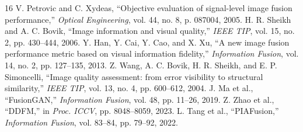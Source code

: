 \documentclass[conference]{IEEEtran}
\begin{document}
\begin{thebibliography}{16}
 V. Petrovic and C. Xydeas, ``Objective evaluation of signal-level image fusion performance,'' \textit{Optical Engineering}, vol. 44, no. 8, p. 087004, 2005.
 H. R. Sheikh and A. C. Bovik, ``Image information and visual quality,'' \textit{IEEE TIP}, vol. 15, no. 2, pp. 430--444, 2006.
 Y. Han, Y. Cai, Y. Cao, and X. Xu, ``A new image fusion performance metric based on visual information fidelity,'' \textit{Information Fusion}, vol. 14, no. 2, pp. 127–135, 2013.
 Z. Wang, A. C. Bovik, H. R. Sheikh, and E. P. Simoncelli, ``Image quality assessment: from error visibility to structural similarity,'' \textit{IEEE TIP}, vol. 13, no. 4, pp. 600--612, 2004.
 J. Ma et al., ``FusionGAN,'' \textit{Information Fusion}, vol. 48, pp. 11--26, 2019.
 Z. Zhao et al., ``DDFM,'' in \textit{Proc. ICCV}, pp. 8048--8059, 2023.
 L. Tang et al., ``PIAFusion,'' \textit{Information Fusion}, vol. 83--84, pp. 79--92, 2022.
\end{thebibliography}
\end{document}

